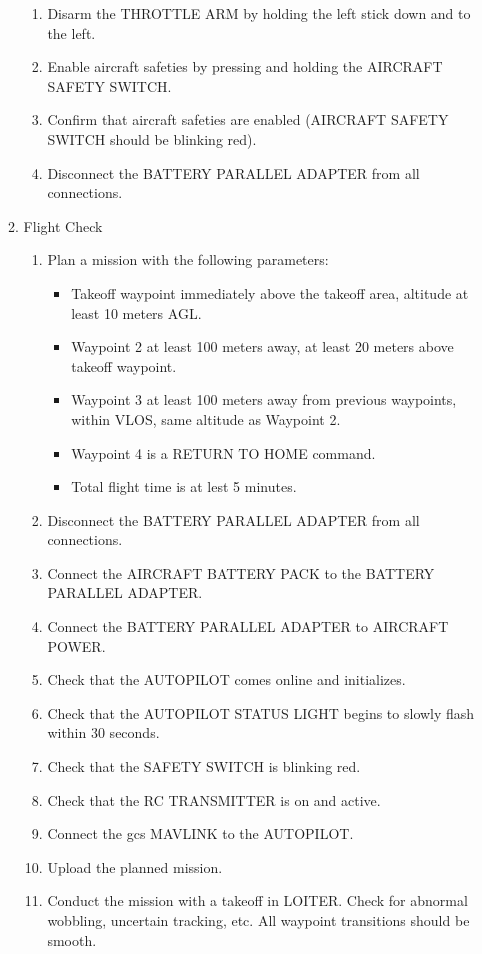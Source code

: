 \documentclass{report}
\begin{document}
\begin{enumerate}
\begin{enumerate}
\begin{enumerate}
							\item Disarm the THROTTLE ARM by holding the left stick down and to the left.
							\item Enable aircraft safeties by pressing and holding the AIRCRAFT SAFETY SWITCH.
							\item Confirm that aircraft safeties are enabled (AIRCRAFT SAFETY SWITCH should be blinking red).
							\item Disconnect the BATTERY PARALLEL ADAPTER from all connections.
						\end{enumerate}
					\item Flight Check
						\begin{enumerate}
							\item Plan a mission with the following parameters:
								\begin{itemize}
									\item Takeoff waypoint immediately above the takeoff area, altitude at least 10 meters AGL.
									\item Waypoint 2 at least 100 meters away, at least 20 meters above takeoff waypoint.
									\item Waypoint 3 at least 100 meters away from previous waypoints, within VLOS, same altitude as Waypoint 2.
									\item Waypoint 4 is a RETURN TO HOME command.
									\item Total flight time is at lest 5 minutes.
								\end{itemize}
							\item Disconnect the BATTERY PARALLEL ADAPTER from all connections.
							\item Connect the AIRCRAFT BATTERY PACK to the BATTERY PARALLEL ADAPTER.
							\item Connect the BATTERY PARALLEL ADAPTER to AIRCRAFT POWER.
							\item Check that the AUTOPILOT comes online and initializes.
							\item Check that the AUTOPILOT STATUS LIGHT begins to slowly flash within 30 seconds.
							\item Check that the SAFETY SWITCH is blinking red.
							\item Check that the RC TRANSMITTER is on and active.
							\item Connect the \gls{gcs} MAVLINK to the AUTOPILOT.
							\item Upload the planned mission.
							\item Conduct the mission with a takeoff in LOITER.  Check for abnormal wobbling, uncertain tracking, etc.  All waypoint transitions should be smooth.

\end{enumerate}
\end{enumerate}
\end{enumerate}
\end{document}
